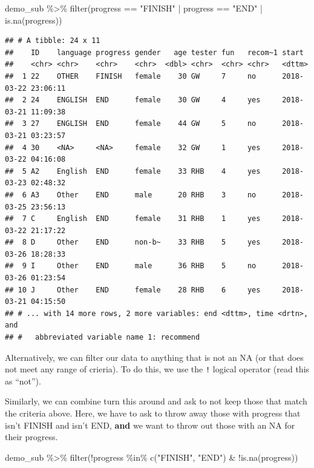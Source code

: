 \documentclass[
]{book}
\newenvironment{Shaded}{\begin{snugshade}}{\end{snugshade}}
\newcommand{\FunctionTok}[1]{\textcolor[rgb]{0.00,0.00,0.00}{#1}}
\newcommand{\NormalTok}[1]{#1}
\newcommand{\SpecialCharTok}[1]{\textcolor[rgb]{0.00,0.00,0.00}{#1}}
\newcommand{\StringTok}[1]{\textcolor[rgb]{0.31,0.60,0.02}{#1}}
\begin{document}
\begin{Shaded}
\begin{Highlighting}[]
\NormalTok{demo\_sub }\SpecialCharTok{\%\textgreater{}\%} \FunctionTok{filter}\NormalTok{(progress }\SpecialCharTok{==} \StringTok{"FINISH"} \SpecialCharTok{|}\NormalTok{ progress }\SpecialCharTok{==} \StringTok{"END"} \SpecialCharTok{|} \FunctionTok{is.na}\NormalTok{(progress))}
\end{Highlighting}
\end{Shaded}

\begin{verbatim}
## # A tibble: 24 x 11
##    ID    language progress gender   age tester fun   recom~1 start              
##    <chr> <chr>    <chr>    <chr>  <dbl> <chr>  <chr> <chr>   <dttm>             
##  1 22    OTHER    FINISH   female    30 GW     7     no      2018-03-22 23:06:11
##  2 24    ENGLISH  END      female    30 GW     4     yes     2018-03-21 11:09:38
##  3 27    ENGLISH  END      female    44 GW     5     no      2018-03-21 03:23:57
##  4 30    <NA>     <NA>     female    32 GW     1     yes     2018-03-22 04:16:08
##  5 A2    English  END      female    33 RHB    4     yes     2018-03-23 02:48:32
##  6 A3    Other    END      male      20 RHB    3     no      2018-03-25 23:56:13
##  7 C     English  END      female    31 RHB    1     yes     2018-03-22 21:17:22
##  8 D     Other    END      non-b~    33 RHB    5     yes     2018-03-26 18:28:33
##  9 I     Other    END      male      36 RHB    5     no      2018-03-26 01:23:54
## 10 J     Other    END      female    28 RHB    6     yes     2018-03-21 04:15:50
## # ... with 14 more rows, 2 more variables: end <dttm>, time <drtn>, and
## #   abbreviated variable name 1: recommend
\end{verbatim}

Alternatively, we can filter our data to anything that is not an NA (or that does not meet any range of crieria). To do this, we use the \texttt{!} logical operator (read this as ``not'').

Similarly, we can combine turn this around and ask to not keep those that match the criteria above. Here, we have to ask to throw away those with progress that isn't FINISH and isn't END, \textbf{and} we want to throw out those with an NA for their progress.

\begin{Shaded}
\begin{Highlighting}[]
\NormalTok{demo\_sub }\SpecialCharTok{\%\textgreater{}\%} \FunctionTok{filter}\NormalTok{(}\SpecialCharTok{!}\NormalTok{progress }\SpecialCharTok{\%in\%} \FunctionTok{c}\NormalTok{(}\StringTok{"FINISH"}\NormalTok{, }\StringTok{"END"}\NormalTok{) }\SpecialCharTok{\&} \SpecialCharTok{!}\FunctionTok{is.na}\NormalTok{(progress))}
\end{Highlighting}
\end{Shaded}
\end{document}
